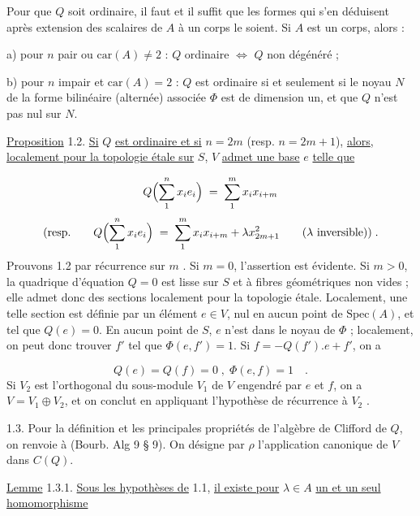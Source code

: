 Pour que $Q$ soit ordinaire, il faut et il suffit que les formes qui s'en déduisent après extension des scalaires de $A$ à un corps le soient. Si $A$ est un corps, alors :

a) pour $n$ pair ou $\mathrm{car}(A) \neq 2$ : $Q$ ordinaire $\Longleftrightarrow$ $Q$ non dégénéré ;

b) pour $n$ impair et $\mathrm{car}(A) = 2$ : $Q$ est ordinaire si et seulement si le noyau $N$ de la forme bilinéaire (alternée) associée $\Phi$ est de dimension un, et que $Q$ n'est pas nul sur $N$.

\underline{Proposition} 1.2. \underline{Si} $Q$ \underline{est ordinaire et si} $n = 2m$ (resp. $n = 2m +1$), \underline{alors}, \underline{localement pour la topologie étale sur} $S$, $V$ \underline{admet une base} \underline{$e$} \underline{telle que} 



\begin{equation*}
 Q\Bigl( \sum_{1}^{n} x_i e_i \Bigr) \;=\; \sum_{1}^{m} x_i x_{i+m}
\end{equation*}
\begin{equation*}
\text{(resp.} \qquad Q\Bigl( \sum_{1}^{n} x_i e_i \Bigr) \;=\; \sum_{1}^{m} x_i x_{i+m} + \lambda x_{2m+1}^{2} \qquad (\lambda \text{ inversible})) \;.
\end{equation*}
Prouvons 1.2 par récurrence sur $m$ . Si $m = 0$, l'assertion est évidente. Si $m > 0$, la quadrique d'équation $Q = 0$ est lisse sur $S$ et à fibres géométriques non vides ; elle admet donc des sections localement pour la topologie étale. Localement, une telle section est définie par un élément $e \in V$, nul en aucun point de $\mathrm{Spec}(A)$, et tel que $Q(e) = 0$. En aucun point de $S$, $e$ n'est dans le noyau de $\Phi$ ; localement, on peut donc trouver $f'$ tel que $\Phi(e,f') = 1$. Si $f = -Q(f').e+f'$, on a

\begin{equation*}
Q(e) = Q(f) = 0 \;,\; \Phi(e,f) = 1 \quad .
\end{equation*}
Si $V_2$ est l'orthogonal du sous-module $V_1$ de $V$ engendré par $e$ et $f$, on a $V = V_1 \oplus V_2$, et on conclut en appliquant l'hypothèse de récurrence à $V_2$ .

1.3. Pour la définition et les principales propriétés de l'algèbre de Clifford de $Q$, on renvoie à (Bourb. Alg 9 \S{} 9). On désigne par $\rho$ l'application canonique de $V$ dans $C(Q)$.

\underline{Lemme} 1.3.1. \underline{Sous les hypothèses de} 1.1, \underline{il existe pour} $\lambda \in A$ \underline{un et un seul homomorphisme}

